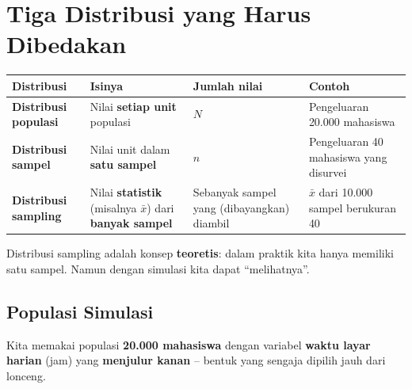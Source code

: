 \documentclass[
  indonesian,
  letterpaper,
]{book}
\newcounter{none} %
\begin{document}
\section{Tiga Distribusi yang Harus
Dibedakan}\label{tiga-distribusi-yang-harus-dibedakan}

{\def\LTcaptype{none} %
\begin{longtable}[]{@{}
  >{\raggedright\arraybackslash}p{}
  >{\raggedright\arraybackslash}p{}
  >{\raggedright\arraybackslash}p{}
  >{\raggedright\arraybackslash}p{}@{}}
\toprule\noalign{}
\begin{minipage}[b]{\linewidth}\raggedright
Distribusi
\end{minipage} & \begin{minipage}[b]{\linewidth}\raggedright
Isinya
\end{minipage} & \begin{minipage}[b]{\linewidth}\raggedright
Jumlah nilai
\end{minipage} & \begin{minipage}[b]{\linewidth}\raggedright
Contoh
\end{minipage} \\
\midrule\noalign{}
\endhead
\bottomrule\noalign{}
\endlastfoot
\textbf{Distribusi populasi} & Nilai \textbf{setiap unit} populasi &
\(N\) & Pengeluaran 20.000 mahasiswa \\
\textbf{Distribusi sampel} & Nilai unit dalam \textbf{satu sampel} &
\(n\) & Pengeluaran 40 mahasiswa yang disurvei \\
\textbf{Distribusi sampling} & Nilai \textbf{statistik} (misalnya
\(\bar{x}\)) dari \textbf{banyak sampel} & Sebanyak sampel yang
(dibayangkan) diambil & \(\bar{x}\) dari 10.000 sampel berukuran 40 \\
\end{longtable}
}

Distribusi sampling adalah konsep \textbf{teoretis}: dalam praktik kita
hanya memiliki satu sampel. Namun dengan simulasi kita dapat
``melihatnya''.

\subsection{Populasi Simulasi}\label{populasi-simulasi}

Kita memakai populasi \textbf{20.000 mahasiswa} dengan variabel
\textbf{waktu layar harian} (jam) yang \textbf{menjulur kanan} -- bentuk
yang sengaja dipilih jauh dari lonceng.
\end{document}
